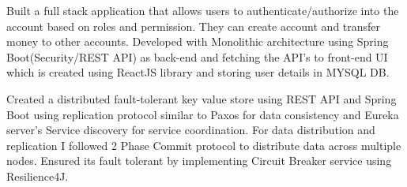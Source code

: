 \documentclass[10pt,a4paper,ragged2e,withhyper]{altacv}
\begin{document}
\begin{paracol}{2}


\switchcolumn



\vspace{10pt}



\divider


\vspace{10pt}

\begin{adjustwidth}{1em}{0em}  %
 Built a full stack application that allows users to authenticate/authorize into the account based on roles and permission. They can create account and transfer money to other accounts. Developed with Monolithic architecture using Spring Boot(Security/REST API) as back-end and fetching the API's to front-end UI which is created using ReactJS library and storing user details in MYSQL DB.


\divider

Created a distributed fault-tolerant key value store using REST API and Spring Boot using replication protocol similar to Paxos for data consistency and Eureka server's Service discovery for service coordination. For data distribution and replication I followed 2 Phase Commit protocol to distribute data across multiple nodes. Ensured its fault tolerant by implementing Circuit Breaker service using Resilience4J.

\divider


\end{adjustwidth}
\end{paracol}
\end{document}

